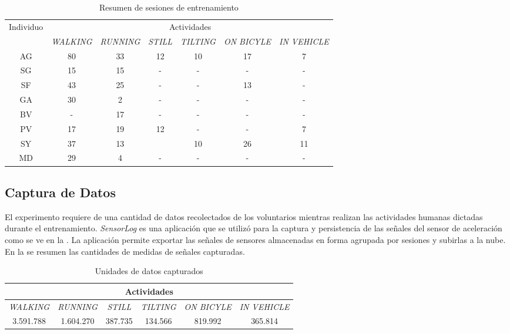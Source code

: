 \begin{table}[h]
\begin{centering}
\begin{tabular}{|c|c|c|c|c|c|c|}
\hline 
\multirow{2}{*}{Individuo} & \multicolumn{6}{c|}{Actividades}\tabularnewline
\cline{2-7} 
 & \emph{\footnotesize{}WALKING} & \emph{\footnotesize{}RUNNING} & \emph{\footnotesize{}STILL} & \emph{\footnotesize{}TILTING} & \emph{\footnotesize{}ON BICYLE} & \emph{\footnotesize{}IN VEHICLE}\tabularnewline
\hline 
\hline 
AG & 80 & 33 & 12 & 10 & 17 & 7\tabularnewline
\hline 
SG & 15 & 15 & - & - & - & -\tabularnewline
\hline 
SF & 43 & 25 & - & - & 13 & -\tabularnewline
\hline 
GA & 30 & 2 & - & - & - & -\tabularnewline
\hline 
BV & - & 17 & - & - & - & -\tabularnewline
\hline 
PV & 17 & 19 & 12 & - & - & 7\tabularnewline
\hline 
SY & 37 & 13 &  & 10 & 26 & 11\tabularnewline
\hline 
MD & 29 & 4 & - & - & - & -\tabularnewline
\hline 
\end{tabular}
\par\end{centering}
\caption{\label{tab6:sesiones}Resumen de sesiones de entrenamiento}
\end{table}


\subsection{Captura de Datos}

El experimento requiere de una cantidad de datos recolectados de los
voluntarios mientras realizan las actividades humanas dictadas durante
el entrenamiento. \emph{SensorLog} \cite{Alan2014s} es una aplicación
 que se utilizó para la captura y persistencia de las
señales del sensor de aceleración como se ve en la .
La aplicación permite exportar las señales de sensores almacenadas
en forma agrupada por sesiones y subirlas a la nube. En la 
se resumen las cantidades de medidas de señales capturadas.

\begin{table}[h]
\begin{centering}
\begin{tabular}{|c|c|c|c|c|c|}
\hline 
\multicolumn{6}{|c|}{Actividades}\tabularnewline
\hline 
\emph{\footnotesize{}WALKING} & \emph{\footnotesize{}RUNNING} & \emph{\footnotesize{}STILL} & \emph{\footnotesize{}TILTING} & \emph{\footnotesize{}ON BICYLE} & \emph{\footnotesize{}IN VEHICLE}\tabularnewline
\hline 
\hline 
3.591.788 & 1.604.270 & 387.735 & 134.566 & 819.992 & 365.814\tabularnewline
\hline 
\end{tabular}
\par\end{centering}
\caption{\label{tab6:captura}Unidades de datos capturados}
\end{table}


